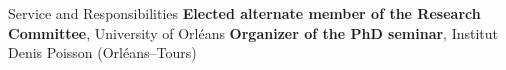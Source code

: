 \begin{rubric}{Service and Responsibilities}
\entry*[2024]%
\textbf{Elected alternate member of the Research Committee}, University of Orléans
%
\entry*[2022--2025]%
\textbf{Organizer of the PhD seminar}, Institut Denis Poisson (Orléans–Tours)
\end{rubric}
